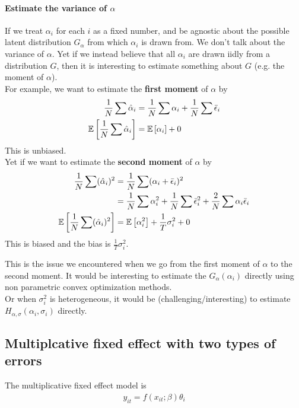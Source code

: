 \paragraph{Estimate the variance of $\alpha$} If we treat $\alpha_i$ for each $i$
as a fixed number, and be agnostic about the possible latent distribution
$G_{\alpha}$ from which $\alpha_i$ is drawn from. We don't talk about the
variance of $\alpha$. Yet if we instead believe that all $\alpha_i$ are drawn
iidly from a distribution $G$, then it is interesting to estimate something
about $G$ (e.g. the moment of $\alpha$). \\ For example, we want to estimate
the \textbf{first moment} of $\alpha$ by \begin{equation*}
    \begin{split}
        \frac{1}{N}\sum \hat{\alpha}_i &= \frac{1}{N}\sum \alpha_i + \frac{1}{N}\sum \bar{\epsilon}_i\\
        \mathbb{E}\left[\frac{1}{N}\sum \hat{\alpha}_i\right] &= \mathbb{E}\left[\alpha_i\right] + 0
    \end{split}
\end{equation*}
This is unbiased.\\
Yet if we want to estimate the \textbf{second moment} of $\alpha$ by \begin{equation*}
    \begin{split}
        \frac{1}{N}\sum (\hat{\alpha}_i)^2 &= \frac{1}{N}\sum (\alpha_i+\bar{\epsilon}_i)^2\\
        &= \frac{1}{N}\sum \alpha_i^2 + \frac{1}{N}\sum \bar{\epsilon}_i^2 + \frac{2}{N}\sum \alpha_i\bar{\epsilon}_i\\
        \mathbb{E}\left[\frac{1}{N}\sum (\hat{\alpha}_i)^2\right] &= \mathbb{E}\left[\alpha_i^2\right] + \frac{1}{T}\sigma_i^2+0\\
    \end{split}
\end{equation*}
This is biased and the bias is $\frac{1}{T}\sigma_i^2$.

This is the issue we encountered when we go from the first moment of $\alpha$
to the second moment. It would be interesting to estimate the
$G_{\alpha}(\alpha_i)$ directly using non parametric convex optimization
methods.\\ Or when $\sigma_i^2$ is heterogeneous, it would be
(challenging/interesting) to estimate $H_{\alpha,\sigma}(\alpha_i,\sigma_i)$
directly.

\subsection{Multiplcative fixed effect with two types of errors}
The multiplicative fixed effect model is \begin{equation*}
    \begin{split}
        y_{it} = f(x_{it};\beta)\theta_i
    \end{split}
\end{equation*}
